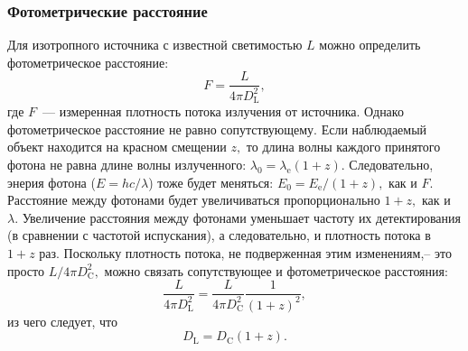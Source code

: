 \subsubsection{Фотометрические расстояние}
Для изотропного источника с известной светимостью $L$ можно определить фотометрическое расстояние:
$$
F = \frac{L}{4 \pi D_{\text{L}}^2},
$$
где $F$~--- измеренная плотность потока излучения от источника. Однако фотометрическое расстояние не равно сопутствующему.
Если наблюдаемый объект находится на красном смещении $z,$ то длина волны каждого принятого фотона не равна длине волны излученного: $\lambda_0 = \lambda_{\text{e}} (1 + z).$ Следовательно, 
энерия фотона ($E = hc \slash \lambda$) тоже будет меняться: $E_0 = E_{\text{e}} \slash (1 + z),$ как и $F.$ Расстояние между фотонами будет увеличиваться пропорционально $1 + z,$ как и $\lambda.$ Увеличение расстояния 
между фотонами уменьшает частоту их детектирования (в сравнении с частотой испускания), а следовательно, и плотность потока в $1 + z$ раз. Поскольку плотность потока, не подверженная этим изменениям,-- это 
просто $L \slash 4 \pi D_{\text{C}}^2,$ можно связать сопутствующее и фотометрическое расстояния:
$$
\frac{L}{4 \pi D_{\text{L}}^2} = \frac{L}{4 \pi D_{\text{C}}^2} \frac{1}{(1 + z)^2},
$$
из чего следует, что
\begin{equation}
	D_{\text{L}} = D_{\text{C}} (1 + z).
\end{equation}